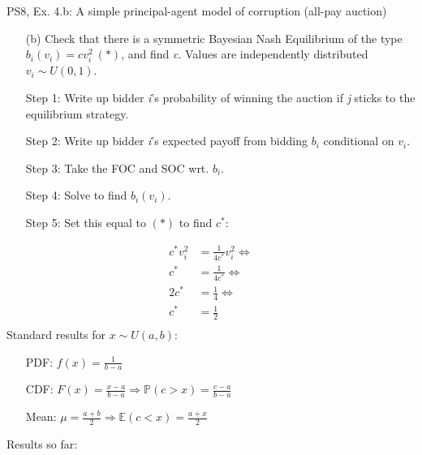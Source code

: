 \begin{frame}{PS8, Ex. 4.b: A simple principal-agent model of corruption (all-pay auction)}
    \begin{itemize}
      \item[(b)] Check that there is a symmetric Bayesian Nash Equilibrium of the type $b_i(v_i) = cv_i^2\ (*)$, and find \textit{c}. Values are independently distributed $v_i\sim U(0, 1)$.
    \end{itemize} \vspace{-8pt}
    \begin{multicols}{2}
      \begin{itemize}
        \item[Step 1:] Write up bidder \textit{i}'s probability of winning the auction if \textit{j} sticks to the equilibrium strategy.
        \item[Step 2:] Write up bidder \textit{i}'s expected payoff from bidding $b_i$ conditional on $v_i$.
        \item[Step 3:] Take the FOC and SOC wrt. $b_i$.
        \item[Step 4:] Solve to find $b_i(v_i)$.
        \item[Step 5:] Set this equal to $(*)$ to find $c^*$:
      \end{itemize} \vspace{-6pt}
      \begin{align*}
        c^*v_i^2&=\frac{1}{4c^*}v_i^2\Leftrightarrow\\
        c^*&=\frac{1}{4c^*}\Leftrightarrow\\
        2c^*&=\frac{1}{4}\Leftrightarrow\\
        c^*&=\frac{1}{2}\\
      \end{align*}
      \vfill\null\columnbreak
      Standard results for $x\sim U(a, b):$ \vspace{-6pt}
      \begin{itemize}
        \item[PDF:] $f(x)=\frac{1}{b-a}$
        \item[CDF:] $F(x)=\frac{x-a}{b-a}\Rightarrow\mathbb{P}(c>x)=\frac{c-a}{b-a}$
        \item[Mean:] $\mu=\frac{a+b}{2}\Rightarrow\mathbb{E}(c<x)=\frac{a+x}{2}$
      \end{itemize}
      \vspace{-6pt}
      Results so far: \vspace{-6pt}
      \begin{align*}

\end{align*}
\end{multicols}
\end{frame}

